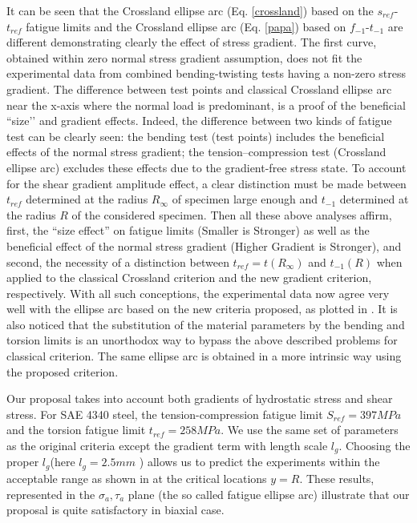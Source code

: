 It can be seen that the Crossland ellipse arc (Eq. \ref{crossland}) based on the $s_{ref}$-$ t_{ref}$ fatigue limits and the Crossland ellipse arc (Eq. \ref{papa}) based on $f_{-1}$-$t_{-1}$ are different demonstrating clearly the effect of stress gradient. The first curve, obtained within zero normal stress gradient assumption, does not fit the experimental data from combined bending-twisting tests having a non-zero stress gradient.  The difference between test points and classical Crossland ellipse arc near the x-axis where the normal load is predominant, is a proof of the beneficial ``size’’ and gradient effects. Indeed, the difference between two kinds of fatigue test can be clearly seen: the bending test (test points) includes the beneficial effects of the normal stress gradient; the tension–compression test (Crossland ellipse arc) excludes these effects due to the gradient-free stress state.  To account for the shear gradient amplitude effect, a clear distinction must be made between $t_{ref}$
determined at the radius $R_{\infty}$ of specimen large enough and $t_{-1}$ determined at the radius $R$ of the considered specimen.
Then all
these above analyses affirm, first, the ``size effect'' on fatigue limits
(Smaller is Stronger) as well as the beneficial effect of the normal
stress gradient (Higher Gradient is Stronger), and second, the
necessity of a distinction between $t_{ref}=t(R_{\infty})$ and $t_{-1}(R)$ when applied to the classical Crossland criterion and the new gradient criterion, respectively. With all such conceptions, the experimental data now agree very well with the ellipse arc based on  the new criteria proposed, as plotted in . It is also noticed that the substitution of the material parameters by the bending and torsion limits is an unorthodox way to bypass the above described problems for classical criterion. The same ellipse arc is obtained in a more intrinsic way using the proposed criterion.

Our proposal takes into account both gradients of hydrostatic stress and shear stress. For SAE 4340 steel, the tension-compression fatigue limit $S_{ref}=397MPa$ and the torsion fatigue limit $t_{ref}=258MPa$. We use the same set of parameters as the original criteria except the gradient term with length scale $l_g$. Choosing the proper $l_g$(here $l_g=2.5mm$ ) allows us to predict the experiments within the acceptable range as shown in  at the critical locations $y=R$. These results, represented in the $\sigma_a, \tau_a$ plane (the so called fatigue ellipse arc)  illustrate that our proposal is quite satisfactory in biaxial case.	

